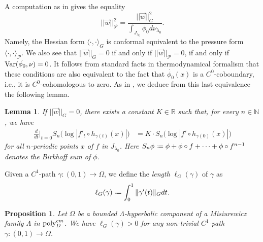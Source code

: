 \documentclass[11pt]{amsart}
\theoremstyle{plain}
\newtheorem{prop}[thm]{Proposition}
\newtheorem{lem}[thm]{Lemma}
\theoremstyle{definition}
\theoremstyle{remark}
\newcommand{\bbR}{\mathbb{R}} %
\newcommand*{\defeq}{\mathrel{\vcenter{\baselineskip0.5ex \lineskiplimit0pt
			\hbox{\scriptsize.}\hbox{\scriptsize.}}}%
	=}
\begin{document}
\bigskip

A computation as in 
\cite[Proposition 4.12]{BH24}
gives the equality
	$$||\vec{w}||_{\mathcal{P}}^2 = \frac{||\vec{w}||_G^2}{\int_{J_{\lambda_0}} \phi_0 d\nu_{\lambda_0}}.
 $$
Namely, the Hessian
form $\langle \cdot, \cdot \rangle_G$ is conformal equivalent
to the pressure form $\langle \cdot, \cdot \rangle_{\mathcal{P}}$. 
We also see that 
$||\vec{w}||_G = 0$
if and only if
$||\vec{w}||_{\mathcal{P}} =0$,
if and only if
${\rm Var}(\dot{\phi_0}, \nu) = 0$. It follows from standard facts in thermodynamical formalism that these conditions are also equivalent to the fact that 
$\dot{\phi_0}(x)$ is a $C^0$-coboundary, i.e., it is $C^0$-cohomologous to zero.
As in \cite{HeNie23},
we deduce from this last equivalence the following lemma. 

\begin{lem} \label{lem_K_equation}
If $||\vec{w}||_G=0$,
there exists a constant $K \in \bbR$ such that, for every $n\in\mathbb N$, we have 
\begin{align*}
\frac{d}{dt}\Big|_{t=0} 
S_n\big(
\log|f'_t\circ h_{{\gamma}(t)}(x)|\big)
&= K \cdot S_n
\big(
\log|f' \circ h_{{\gamma}(0)}(x)|\big)
\end{align*} 
for all 
$n$-periodic
points
$x$ of $f$ 
in $J_{\lambda_0}$.
Here $S_n\phi \defeq \phi + \phi \circ f + \cdots + \phi \circ f^{n-1}$
denotes the Birkhoff sum of $\phi$. 
\end{lem}

Given a $C^1$-path $\gamma \colon (0,1)\to \Omega$, we define the {\it length} $\ell_G(\gamma)$ of $\gamma$ as
$$\ell_G(\gamma) \defeq \int_0^1 \|\gamma'(t)\|_G dt.$$

\begin{prop}\label{p:non-deg-analytic-paths}
Let $\Omega$ be a bounded $\Lambda$-hyperbolic component of a Misiurewicz family $\Lambda$ in ${\rm poly}_D^{cm}$.
We have $\ell_G(\gamma)>0$ for any non-trivial
$C^1$-path $\gamma \colon (0,1)\to \Omega$.
\end{prop}
\end{document}
